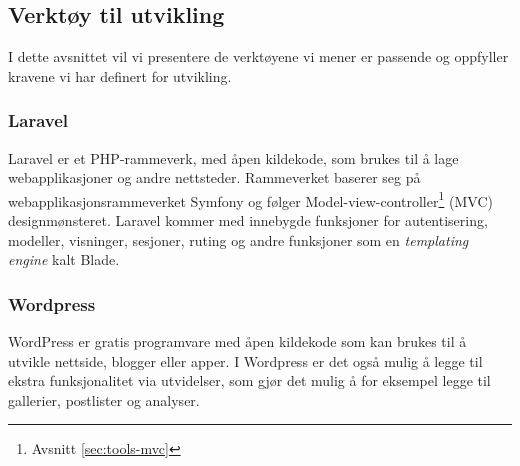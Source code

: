 
\subsection{Verktøy til utvikling}
I dette avsnittet vil vi presentere de verktøyene vi mener er passende og oppfyller kravene vi har definert for utvikling. 

\subsubsection{Laravel}
Laravel \cite{cbcp2019lvw} er et PHP-rammeverk, med åpen kildekode, som brukes til å lage webapplikasjoner og andre nettsteder. Rammeverket baserer seg på webapplikasjonsrammeverket Symfony og følger Model-view-controller\footnote{Avsnitt \ref{sec:tools-mvc}} (MVC) designmønsteret.
Laravel kommer med innebygde funksjoner for autentisering, modeller, visninger, sesjoner, ruting og andre funksjoner som en \textit{templating engine} kalt Blade.

\subsubsection{Wordpress}
WordPress\cite{wordpress} er gratis programvare med åpen kildekode som kan brukes til å utvikle nettside, blogger eller apper. I Wordpress er det også mulig å legge til ekstra funksjonalitet via utvidelser, som gjør det mulig å for eksempel legge til gallerier, postlister og analyser.



